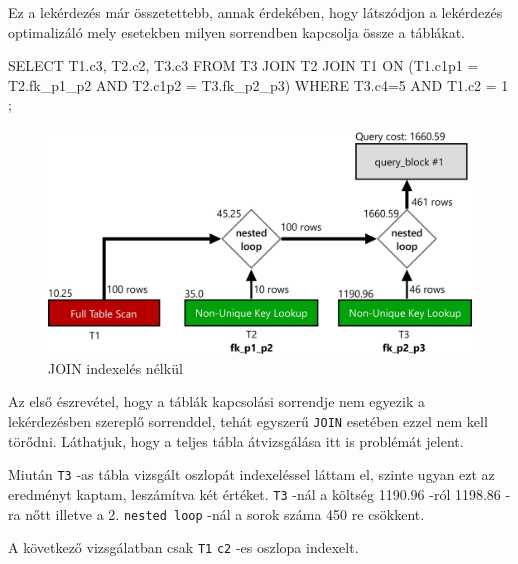 
Ez a lekérdezés már összetettebb, annak érdekében, hogy látszódjon a lekérdezés optimalizáló mely esetekben milyen sorrendben kapcsolja össze a táblákat.
\begin{python}
SELECT T1.c3, T2.c2, T3.c3 FROM T3 JOIN T2 JOIN T1 
	ON (T1.c1p1 = T2.fk_p1_p2 AND T2.c1p2 = T3.fk_p2_p3) 
	WHERE  T3.c4=5 AND T1.c2 = 1 ;
\end{python}

\begin{figure}[h!]
\centering
\includegraphics[width=14cm]{images/explain/3-1.png}
\caption{JOIN indexelés nélkül}
\label{fig:schema}
\end{figure}

Az első észrevétel, hogy a táblák kapcsolási sorrendje nem egyezik a lekérdezésben szereplő sorrenddel, tehát egyszerű \texttt{JOIN} esetében ezzel nem kell törődni. Láthatjuk, hogy a teljes tábla átvizsgálása itt is problémát jelent. 

Miután \texttt{T3} -as tábla vizsgált oszlopát indexeléssel láttam el, szinte ugyan ezt az eredményt kaptam, leszámítva két értéket. \texttt{T3} -nál a költség 1190.96 -ról 1198.86 -ra nőtt illetve a 2. \texttt{nested loop} -nál a sorok száma 450 re csökkent.

\newpage
A következő vizsgálatban csak \texttt{T1} \texttt{c2} -es oszlopa indexelt.

